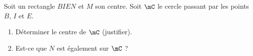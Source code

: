 
\begin{exercice}\label{exo2smath-0305}

    Soit un rectangle \( BIEN\) et \( M\) son centre. Soit \( \mC\) le cercle passant par les points \( B\), \( I\) et \( E\).
    \begin{enumerate}
        \item
            Déterminer le centre de \( \mC\) (justifier).
        \item
            Est-ce que \( N\) est également sur \( \mC\) ?
    \end{enumerate}

\end{exercice}
